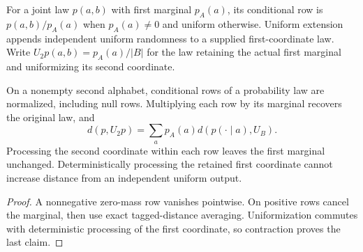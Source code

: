 \begin{definition}
  \label{def:lowerbounds-algebraic-conditional-weights}
  \leanok
  For a joint law $p(a,b)$ with first marginal $p_A(a)$, its conditional
  row is $p(a,b)/p_A(a)$ when $p_A(a)\ne0$ and uniform otherwise.
  Uniform extension appends independent uniform randomness to a supplied
  first-coordinate law. Write $U_2p(a,b)=p_A(a)/|B|$ for the law retaining
  the actual first marginal and uniformizing its second coordinate.
\end{definition}

\begin{theorem}
  \label{thm:lowerbounds-algebraic-conditional-distance}
  \leanok
  On a nonempty second alphabet, conditional rows of a probability law
  are normalized, including null rows. Multiplying each row by its
  marginal recovers the original law, and
  \[
    d(p,U_2p)=\sum_a p_A(a)d(p(\cdot\mid a),U_B).
  \]
  Processing the second coordinate within each row leaves the first
  marginal unchanged. Deterministically processing the retained first
  coordinate cannot increase distance from an independent uniform output.
\end{theorem}
\begin{proof}
  \leanok
  A nonnegative zero-mass row vanishes pointwise. On positive rows cancel
  the marginal, then use exact tagged-distance averaging. Uniformization
  commutes with deterministic processing of the first coordinate, so
  contraction proves the last claim.
\end{proof}

